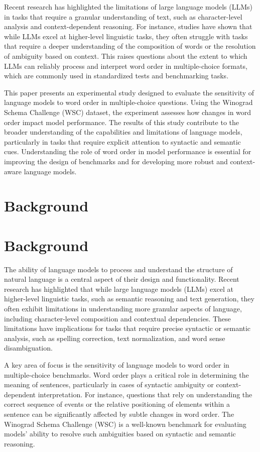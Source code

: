 \documentclass{article}
\begin{document}
Recent research has highlighted the limitations of large language models (LLMs) in tasks that require a granular understanding of text, such as character-level analysis and context-dependent reasoning. For instance, studies have shown that while LLMs excel at higher-level linguistic tasks, they often struggle with tasks that require a deeper understanding of the composition of words or the resolution of ambiguity based on context. This raises questions about the extent to which LLMs can reliably process and interpret word order in multiple-choice formats, which are commonly used in standardized tests and benchmarking tasks.

This paper presents an experimental study designed to evaluate the sensitivity of language models to word order in multiple-choice questions. Using the Winograd Schema Challenge (WSC) dataset, the experiment assesses how changes in word order impact model performance. The results of this study contribute to the broader understanding of the capabilities and limitations of language models, particularly in tasks that require explicit attention to syntactic and semantic cues. Understanding the role of word order in model performance is essential for improving the design of benchmarks and for developing more robust and context-aware language models.
\section{Background}
\section*{Background}

The ability of language models to process and understand the structure of natural language is a central aspect of their design and functionality. Recent research has highlighted that while large language models (LLMs) excel at higher-level linguistic tasks, such as semantic reasoning and text generation, they often exhibit limitations in understanding more granular aspects of language, including character-level composition and contextual dependencies. These limitations have implications for tasks that require precise syntactic or semantic analysis, such as spelling correction, text normalization, and word sense disambiguation.

A key area of focus is the sensitivity of language models to word order in multiple-choice benchmarks. Word order plays a critical role in determining the meaning of sentences, particularly in cases of syntactic ambiguity or context-dependent interpretation. For instance, questions that rely on understanding the correct sequence of events or the relative positioning of elements within a sentence can be significantly affected by subtle changes in word order. The Winograd Schema Challenge (WSC) is a well-known benchmark for evaluating models' ability to resolve such ambiguities based on syntactic and semantic reasoning. 
\end{document}
